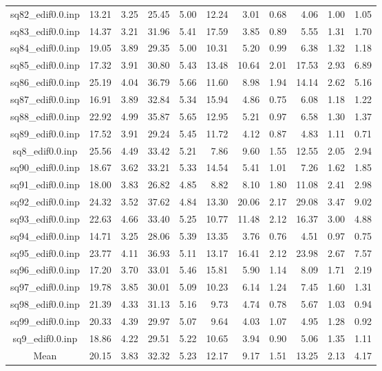 {\begin{longtable}{@{}cr@{\hspace{1em}}r@{\hspace{1em}}r@{\hspace{1em}}r@{\hspace{1em}}r@{\hspace{2em}}r@{\hspace{1em}}r@{\hspace{1em}}r@{\hspace{1em}}r@{\hspace{1em}}r@{}}
sq82\_edif0.0.inp&13.21&3.25&25.45&5.00&12.24&3.01&0.68&4.06&1.00&1.05\\
sq83\_edif0.0.inp&14.37&3.21&31.96&5.41&17.59&3.85&0.89&5.55&1.31&1.70\\
sq84\_edif0.0.inp&19.05&3.89&29.35&5.00&10.31&5.20&0.99&6.38&1.32&1.18\\
sq85\_edif0.0.inp&17.32&3.91&30.80&5.43&13.48&10.64&2.01&17.53&2.93&6.89\\
sq86\_edif0.0.inp&25.19&4.04&36.79&5.66&11.60&8.98&1.94&14.14&2.62&5.16\\
sq87\_edif0.0.inp&16.91&3.89&32.84&5.34&15.94&4.86&0.75&6.08&1.18&1.22\\
sq88\_edif0.0.inp&22.92&4.99&35.87&5.65&12.95&5.21&0.97&6.58&1.30&1.37\\
sq89\_edif0.0.inp&17.52&3.91&29.24&5.45&11.72&4.12&0.87&4.83&1.11&0.71\\
sq8\_edif0.0.inp&25.56&4.49&33.42&5.21&7.86&9.60&1.55&12.55&2.05&2.94\\
sq90\_edif0.0.inp&18.67&3.62&33.21&5.33&14.54&5.41&1.01&7.26&1.62&1.85\\
sq91\_edif0.0.inp&18.00&3.83&26.82&4.85&8.82&8.10&1.80&11.08&2.41&2.98\\
sq92\_edif0.0.inp&24.32&3.52&37.62&4.84&13.30&20.06&2.17&29.08&3.47&9.02\\
sq93\_edif0.0.inp&22.63&4.66&33.40&5.25&10.77&11.48&2.12&16.37&3.00&4.88\\
sq94\_edif0.0.inp&14.71&3.25&28.06&5.39&13.35&3.76&0.76&4.51&0.97&0.75\\
sq95\_edif0.0.inp&23.77&4.11&36.93&5.11&13.17&16.41&2.12&23.98&2.67&7.57\\
sq96\_edif0.0.inp&17.20&3.70&33.01&5.46&15.81&5.90&1.14&8.09&1.71&2.19\\
sq97\_edif0.0.inp&19.78&3.85&30.01&5.09&10.23&6.14&1.24&7.45&1.60&1.31\\
sq98\_edif0.0.inp&21.39&4.33&31.13&5.16&9.73&4.74&0.78&5.67&1.03&0.94\\
sq99\_edif0.0.inp&20.33&4.39&29.97&5.07&9.64&4.03&1.07&4.95&1.28&0.92\\
sq9\_edif0.0.inp&18.86&4.22&29.51&5.22&10.65&3.94&0.90&5.06&1.35&1.11\\
\midrule
Mean&20.15&3.83&32.32&5.23&12.17&9.17&1.51&13.25&2.13&4.17\\
\bottomrule
\end{longtable}}
